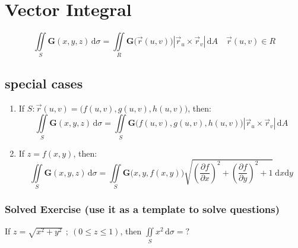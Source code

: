 \documentclass[12pt, fleqn]{book}
\newcommand{\D}{\mathrm{d}}
\newcommand{\iis}{\iint\limits_S}
\newcommand{\rutrv}{\vec{r}_u \times \vec{r}_v\right}
\newcommand{\G}{\mathbf{G}}
\newcommand{\xy}{(x, y)}
\newcommand{\xyz}{(x, y, z)}
\newcommand{\uv}{(u, v)}
\newcommand{\rond}[2]{\frac{\partial #1}{\partial #2}}
\begin{document}
	\section{Vector Integral}
		\begin{equation}
			\iis \G\xyz \, \D \sigma 
			  = \iint\limits_R \G\big(\vec{r}\uv\big) 
			    \left|\rutrv| 
			    \, \D A 
			    \quad \vec{r}\uv \in R
		\end{equation}
		\subsection{special cases}
			\begin{enumerate}
				\item If $S: \vec{r}\uv = \big(f\uv, g\uv, h\uv\big)$, then:
					\begin{equation}
						\iis \G\xyz \, \D \sigma
						= \iis \G\big(f\uv, g\uv, h\uv\big) 
						\left|\rutrv| 
						\, \D A
					\end{equation}
				\item If $z = f\xy$, then:
					\begin{equation}
						\iis \G\xyz \, \D \sigma
						= \iis \G\big(x, y, f\xy\big)
						\sqrt{
							(\rond{f}{x})^2 + 
							(\rond{f}{y})^2 + 
							1
						} 
						\ \D x \D y
					\end{equation}				
			\end{enumerate}
	 		\subsubsection{Solved Exercise (use it as a template to solve questions)}
	 			If $z = \sqrt{x^2 + y^2} \ \, ; \ (0 \le z \le 1)$, then $\iis x^2 \, \D \sigma = ?$
	 			
\end{document}
